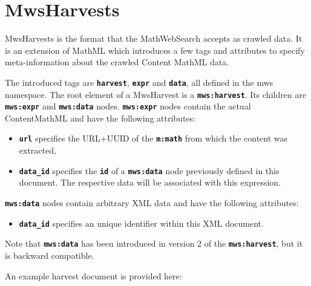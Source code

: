 \documentclass{deliverablereport}
\begin{document}
\section{MwsHarvests}\label{sec:harvests}

MwsHarvests is the format that the MathWebSearch accepts as crawled data. It is an extension of MathML which introduces a few tags and attributes to specify meta-information about the crawled Content MathML data. \par

The introduced tags are \textbf{\texttt{harvest}}, \textbf{\texttt{expr}} and \textbf{\texttt{data}}, all defined in the mws namespace. The root element of a MwsHarvest is a \textbf{\texttt{mws:harvest}}. Its children are \textbf{\texttt{mws:expr}} and \textbf{\texttt{mws:data}} nodes. \textbf{\texttt{mws:expr}} nodes contain the actual ContentMathML and have the following attributes: \par

\begin{itemize}
\item \textbf{\texttt{url}} specifies the URL+UUID of the \textbf{\texttt{m:math}} from which the content was extracted,
\item \textbf{\texttt{data\_id}} specifies the \textbf{\texttt{id}} of a \textbf{\texttt{mws:data}} node previously defined in this document. The respective data will be associated with this expression.
\end{itemize}

\textbf{\texttt{mws:data}} nodes contain arbitrary XML data and have the following attributes:
\begin{itemize}
\item \textbf{\texttt{data\_id}} specifies an unique identifier within this XML document.
\end{itemize}

Note that \textbf{\texttt{mws:data}} has been introduced in version 2 of the \textbf{\texttt{mws:harvest}}, but it is backward compatible.

An example harvest document is provided here:

\vspace{5mm}
\end{document}
